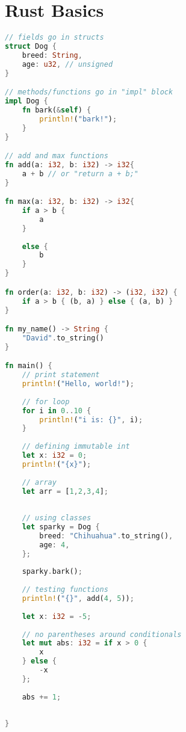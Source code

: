 \section{Rust Basics}

\begin{lstlisting}[language = Rust]
// fields go in structs
struct Dog {
    breed: String,
    age: u32, // unsigned
}

// methods/functions go in "impl" block
impl Dog {
    fn bark(&self) {
        println!("bark!");
    }
}

// add and max functions
fn add(a: i32, b: i32) -> i32{
    a + b // or "return a + b;"
}

fn max(a: i32, b: i32) -> i32{
    if a > b {
        a
    }
    
    else {
        b
    }
}

fn order(a: i32, b: i32) -> (i32, i32) {
    if a > b { (b, a) } else { (a, b) }
}

fn my_name() -> String {
    "David".to_string()
}

fn main() {
    // print statement
    println!("Hello, world!");
    
    // for loop
    for i in 0..10 {
        println!("i is: {}", i);
    }
    
    // defining immutable int 
    let x: i32 = 0;
    println!("{x}");
    
    // array 
    let arr = [1,2,3,4];
    
    
    // using classes
    let sparky = Dog {
        breed: "Chihuahua".to_string(),
        age: 4,
    };
    
    sparky.bark();
    
    // testing functions
    println!("{}", add(4, 5));
    
    let x: i32 = -5;
    
    // no parentheses around conditionals
    let mut abs: i32 = if x > 0 {
        x
    } else {
        -x
    };
    
    abs += 1;
    
    
}
\end{lstlisting}